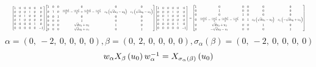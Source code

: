 \documentclass[11pt]{article}
\theoremstyle{definition}
\begin{document}
\[
\scaletoalign{\textwidth}{{\left[\begin{matrix}1 & 0 & 0 & 0 & 0 & 0\\0 & 0 & 0 & 1 & 0 & 0\\0 & 0 & 1 & 0 & 0 & 0\\0 & 1 & 0 & 0 & 0 & 0\\0 & 0 & 0 & 0 & 1 & 0\\0 & 0 & 0 & 0 & 0 & -1\end{matrix}\right]} {\left[\begin{matrix}1 & 0 & 0 & 0 & 0 & 0\\0 & 1 & 0 & \frac{c_{0} d u_{3}^{2}}{2} - \frac{c_{0} u_{2}^{2}}{2} + \frac{c_{1} d u_{0}^{2}}{2} - \frac{c_{1} u_{1}^{2}}{2} & c_{0} \left(\sqrt{d} u_{3} - u_{2}\right) & c_{1} \left(\sqrt{d} u_{0} - u_{1}\right)\\0 & 0 & 1 & 0 & 0 & 0\\0 & 0 & 0 & 1 & 0 & 0\\0 & 0 & 0 & \sqrt{d} u_{3} + u_{2} & 1 & 0\\0 & 0 & 0 & \sqrt{d} u_{0} + u_{1} & 0 & 1\end{matrix}\right]} {\left[\begin{matrix}1 & 0 & 0 & 0 & 0 & 0\\0 & 0 & 0 & 1 & 0 & 0\\0 & 0 & 1 & 0 & 0 & 0\\0 & 1 & 0 & 0 & 0 & 0\\0 & 0 & 0 & 0 & 1 & 0\\0 & 0 & 0 & 0 & 0 & -1\end{matrix}\right]} = {\left[\begin{matrix}1 & 0 & 0 & 0 & 0 & 0\\0 & 1 & 0 & 0 & 0 & 0\\0 & 0 & 1 & 0 & 0 & 0\\0 & \frac{c_{0} d u_{3}^{2}}{2} - \frac{c_{0} u_{2}^{2}}{2} + \frac{c_{1} d u_{0}^{2}}{2} - \frac{c_{1} u_{1}^{2}}{2} & 0 & 1 & c_{0} \left(\sqrt{d} u_{3} - u_{2}\right) & c_{1} \left(- \sqrt{d} u_{0} + u_{1}\right)\\0 & \sqrt{d} u_{3} + u_{2} & 0 & 0 & 1 & 0\\0 & - \sqrt{d} u_{0} - u_{1} & 0 & 0 & 0 & 1\end{matrix}\right]}}
\]
\[
\alpha = \left( 0, \  -2, \  0, \  0, \  0, \  0\right), \beta = \left( 0, \  2, \  0, \  0, \  0, \  0\right), \sigma_{\alpha}(\beta) = \left( 0, \  -2, \  0, \  0, \  0, \  0\right)
\]
\[
\scaletoalign{\textwidth}{w_{\alpha} X_{\beta}\left(u_{0}\right) w_{\alpha}^{-1} = X_{\sigma_{\alpha}\left(\beta\right)}\left(u_{0}\right)}
\]
\end{document}
